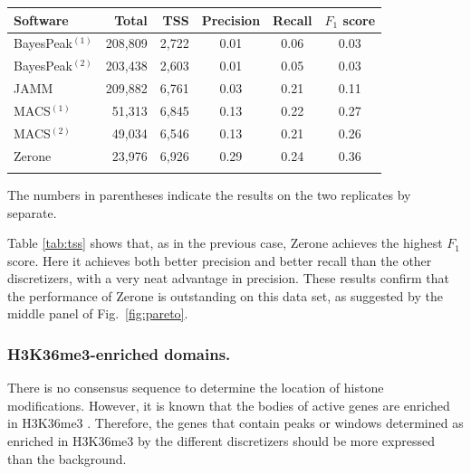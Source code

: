 \documentclass{bioinfo}
\begin{document}
\begin{table}[!t]
{\begin{tabular}{lrrccc}
        \toprule
        \textbf{Software}  & \textbf{Total}  & \textbf{TSS} &
        \textbf{Precision} & \textbf{Recall} & \textbf{$F_{1}$ score} \\
        \midrule
        BayesPeak$^{(1)}$ & 208,809 & 2,722 & 0.01 & 0.06 & 0.03 \\
        BayesPeak$^{(2)}$ & 203,438 & 2,603 & 0.01 & 0.05 & 0.03 \\
        JAMM              & 209,882 & 6,761 & 0.03 & 0.21 & 0.11 \\
        MACS$^{(1)}$      &  51,313 & 6,845 & 0.13 & 0.22 & 0.27 \\
        MACS$^{(2)}$      &  49,034 & 6,546 & 0.13 & 0.21 & 0.26 \\
        Zerone            &  23,976 & 6,926 & 0.29 & 0.24 & 0.36 \\
        \botrule
\end{tabular}}{The numbers in parentheses indicate the results on the two
replicates by separate.}
\end{table}

Table \ref{tab:tss} shows that, as in the previous case, Zerone
achieves the highest $F_1$ score. Here it achieves both better
precision and better recall than the other discretizers, with a
very neat advantage in precision. These results confirm that
the performance of Zerone is outstanding on this data set, as suggested
by the middle panel of Fig.~\ref{fig:pareto}.

\subsubsection{H3K36me3-enriched domains.}
There is no consensus sequence to determine the location of histone
modifications. However, it is known that the bodies of active genes
are enriched in H3K36me3 \citep{pmid16122420,pmid23739122}. Therefore,
the genes that contain peaks or windows determined as enriched in
H3K36me3 by the different discretizers should be more expressed than
the background.
\end{document}
